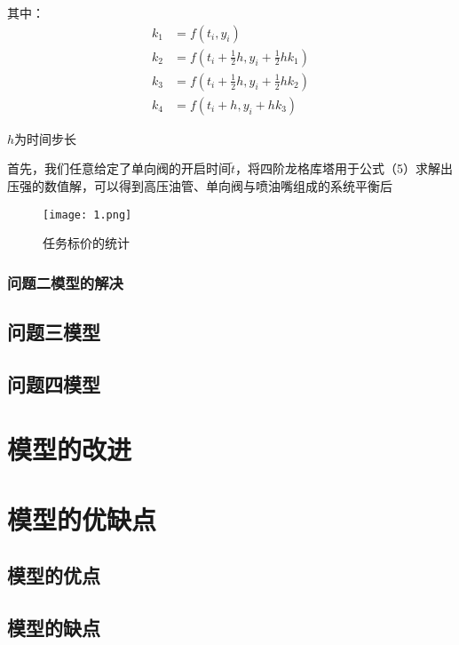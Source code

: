 \documentclass[withoutpreface,bwprint]{cumcmthesis} %
\begin{document}
其中：
\begin{align*}
k_{1}&=f(t_{i},y_{i})\\
k_{2}&=f(t_{i}+\frac{1}{2}h,y_{i}+\frac{1}{2}hk_{1})\\
k_{3}&=f(t_{i}+\frac{1}{2}h,y_{i}+\frac{1}{2}hk_{2})\\
k_{4}&=f(t_{i}+h,y_{i}+hk_{3})
\end{align*}

$h$为时间步长

首先，我们任意给定了单向阀的开启时间$\widetilde{t}$，将四阶龙格库塔用于公式（5）求解出压强的数值解，可以得到高压油管、单向阀与喷油嘴组成的系统平衡后
\begin{figure}[!h]
	\centering
	\texttt{[image: 1.png]}
	\caption{任务标价的统计}
\end{figure}




\subsubsection{问题二模型的解决}

 
\subsection{问题三模型}

\subsection{问题四模型}


\section{模型的改进}


\section{模型的优缺点}
\subsection{模型的优点}

\subsection{模型的缺点}
\end{document}

